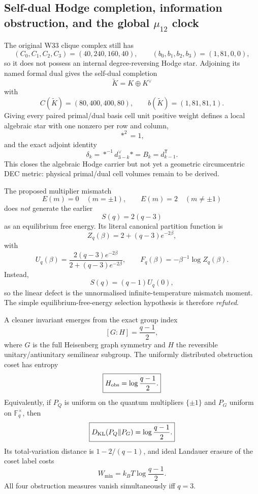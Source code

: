 \subsection*{Self-dual Hodge completion, information obstruction, and the global \(\mu_{12}\) clock}

The original W33 clique complex still has
\[
(C_0,C_1,C_2,C_3)=(40,240,160,40),
\qquad
(b_0,b_1,b_2,b_3)=(1,81,0,0),
\]
so it does not possess an internal degree-reversing Hodge star.  Adjoining its
named formal dual gives the self-dual completion
\[
\widetilde K=K\oplus K^\vee
\]
with
\[
\boxed{
C(\widetilde K)=(80,400,400,80),
\qquad
b(\widetilde K)=(1,81,81,1).
}
\]
Giving every paired primal/dual basis cell unit positive weight defines a local
algebraic star with one nonzero per row and column,
\[
*^2=1,
\]
and the exact adjoint identity
\[
\boxed{
\delta_k=*^{-1}d^\vee_{3-k}*=B_k=d_{k-1}^{\mathsf T}.
}
\]
This closes the algebraic Hodge carrier but not yet a geometric circumcentric
DEC metric: physical primal/dual cell volumes remain to be derived.

The proposed multiplier mismatch
\[
E(m)=0\quad(m=\pm1),\qquad E(m)=2\quad(m\ne\pm1)
\]
does \emph{not} generate the earlier
\[
S(q)=2(q-3)
\]
as an equilibrium free energy.  Its literal canonical partition function is
\[
\boxed{
Z_q(\beta)=2+(q-3)e^{-2\beta},
}
\]
with
\[
U_q(\beta)=
\frac{2(q-3)e^{-2\beta}}
     {2+(q-3)e^{-2\beta}},
\qquad
F_q(\beta)=-\beta^{-1}\log Z_q(\beta).
\]
Instead,
\[
\boxed{S(q)=(q-1)U_q(0),}
\]
so the linear defect is the unnormalised infinite-temperature mismatch moment.
The simple equilibrium-free-energy selection hypothesis is therefore
\emph{refuted}.

A cleaner invariant emerges from the exact group index
\[
[G:H]=\frac{q-1}{2},
\]
where \(G\) is the full Heisenberg graph symmetry and \(H\) the reversible
unitary/antiunitary semilinear subgroup.  The uniformly distributed obstruction
coset has entropy
\[
\boxed{
H_{\rm obs}=\log\frac{q-1}{2}.
}
\]
Equivalently, if \(P_Q\) is uniform on the quantum multipliers \(\{\pm1\}\)
and \(P_G\) uniform on \(\mathbb F_q^\times\), then
\[
\boxed{
D_{\rm KL}(P_Q\Vert P_G)
=
\log\frac{q-1}{2}.
}
\]
Its total-variation distance is \(1-2/(q-1)\), and ideal Landauer erasure of
the coset label costs
\[
\boxed{
W_{\min}=k_BT\log\frac{q-1}{2}.
}
\]
All four obstruction measures vanish simultaneously iff \(q=3\).

